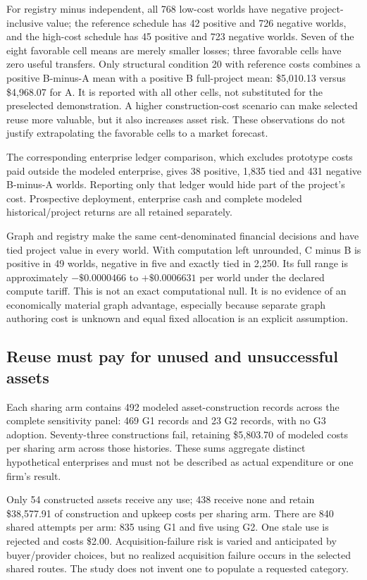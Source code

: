 For registry minus independent, all 768 low-cost worlds have negative project-inclusive value; the reference schedule has 42 positive and 726 negative worlds, and the high-cost schedule has 45 positive and 723 negative worlds. Seven of the eight favorable cell means are merely smaller losses; three favorable cells have zero useful transfers. Only structural condition 20 with reference costs combines a positive B-minus-A mean with a positive B full-project mean: \$5,010.13 versus \$4,968.07 for A. It is reported with all other cells, not substituted for the preselected demonstration. A higher construction-cost scenario can make selected reuse more valuable, but it also increases asset risk. These observations do not justify extrapolating the favorable cells to a market forecast.

The corresponding enterprise ledger comparison, which excludes prototype costs paid outside the modeled enterprise, gives 38 positive, 1,835 tied and 431 negative B-minus-A worlds. Reporting only that ledger would hide part of the project's cost. Prospective deployment, enterprise cash and complete modeled historical/project returns are all retained separately.

Graph and registry make the same cent-denominated financial decisions and have tied project value in every world. With computation left unrounded, C minus B is positive in 49 worlds, negative in five and exactly tied in 2,250. Its full range is approximately $-\$0.0000466$ to $+\$0.0006631$ per world under the declared compute tariff. This is not an exact computational null. It is no evidence of an economically material graph advantage, especially because separate graph authoring cost is unknown and equal fixed allocation is an explicit assumption.

\subsection{Reuse must pay for unused and unsuccessful assets}

Each sharing arm contains 492 modeled asset-construction records across the complete sensitivity panel: 469 G1 records and 23 G2 records, with no G3 adoption. Seventy-three constructions fail, retaining \$5,803.70 of modeled costs per sharing arm across those histories. These sums aggregate distinct hypothetical enterprises and must not be described as actual expenditure or one firm's result.

Only 54 constructed assets receive any use; 438 receive none and retain \$38,577.91 of construction and upkeep costs per sharing arm. There are 840 shared attempts per arm: 835 using G1 and five using G2. One stale use is rejected and costs \$2.00. Acquisition-failure risk is varied and anticipated by buyer/provider choices, but no realized acquisition failure occurs in the selected shared routes. The study does not invent one to populate a requested category.

